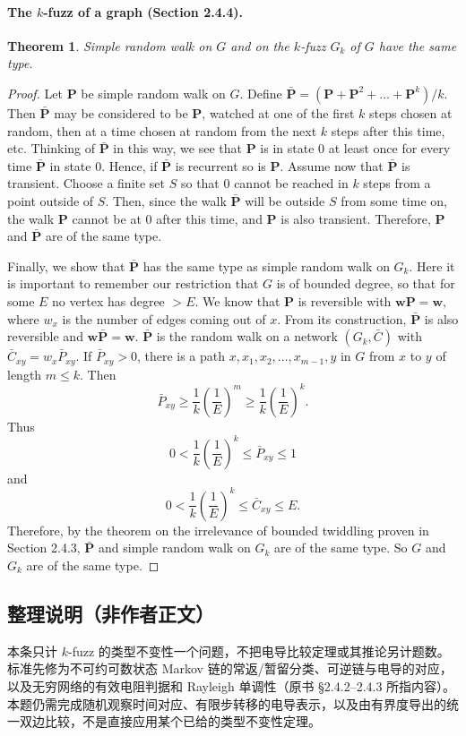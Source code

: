 \documentclass[UTF8,11pt]{ctexart}
\newtheorem*{theorem}{Theorem}
\theoremstyle{definition}
\begin{document}
\paragraph{The $k$-fuzz of a graph (Section 2.4.4).}
\begin{theorem}
Simple random walk on $G$ and on the $k$-fuzz $G_k$ of $G$ have the same type.
\end{theorem}
\begin{proof}
Let $\mathbf P$ be simple random walk on $G$. Define $\bar{\mathbf P}=(\mathbf P+\mathbf P^2+\ldots+\mathbf P^k)/k$. Then $\bar{\mathbf P}$ may be considered to be $\mathbf P$, watched at one of the first $k$ steps chosen at random, then at a time chosen at random from the next $k$ steps after this time, etc. Thinking of $\bar{\mathbf P}$ in this way, we see that $\mathbf P$ is in state $0$ at least once for every time $\bar{\mathbf P}$ in state $0$. Hence, if $\bar{\mathbf P}$ is recurrent so is $\mathbf P$. Assume now that $\bar{\mathbf P}$ is transient. Choose a finite set $S$ so that $0$ cannot be reached in $k$ steps from a point outside of $S$. Then, since the walk $\bar{\mathbf P}$ will be outside $S$ from some time on, the walk $\mathbf P$ cannot be at $0$ after this time, and $\mathbf P$ is also transient. Therefore, $\mathbf P$ and $\bar{\mathbf P}$ are of the same type.

Finally, we show that $\bar{\mathbf P}$ has the same type as simple random walk on $G_k$. Here it is important to remember our restriction that $G$ is of bounded degree, so that for some $E$ no vertex has degree $>E$. We know that $\mathbf P$ is reversible with $\mathbf w\mathbf P=\mathbf w$, where $w_x$ is the number of edges coming out of $x$. From its construction, $\bar{\mathbf P}$ is also reversible and $\mathbf w\bar{\mathbf P}=\mathbf w$. $\bar{\mathbf P}$ is the random walk on a network $(G_k,\bar C)$ with $\bar C_{xy}=w_x\bar P_{xy}$. If $\bar P_{xy}>0$, there is a path $x,x_1,x_2,\ldots,x_{m-1},y$ in $G$ from $x$ to $y$ of length $m\le k$. Then
\[
\bar P_{xy}\ge\frac1k\left(\frac1E\right)^m
\ge\frac1k\left(\frac1E\right)^k.
\]
Thus
\[
0<\frac1k\left(\frac1E\right)^k\le\bar P_{xy}\le1
\]
and
\[
0<\frac1k\left(\frac1E\right)^k\le\bar C_{xy}\le E.
\]
Therefore, by the theorem on the irrelevance of bounded twiddling proven in Section 2.4.3, $\bar{\mathbf P}$ and simple random walk on $G_k$ are of the same type. So $G$ and $G_k$ are of the same type.
\end{proof}
\subsection*{整理说明（非作者正文）}
本条只计 $k$-fuzz 的类型不变性一个问题，不把电导比较定理或其推论另计题数。标准先修为不可约可数状态 Markov 链的常返/暂留分类、可逆链与电导的对应，以及无穷网络的有效电阻判据和 Rayleigh 单调性（原书 \S2.4.2--2.4.3 所指内容）。本题仍需完成随机观察时间对应、有限步转移的电导表示，以及由有界度导出的统一双边比较，不是直接应用某个已给的类型不变性定理。
\end{document}
